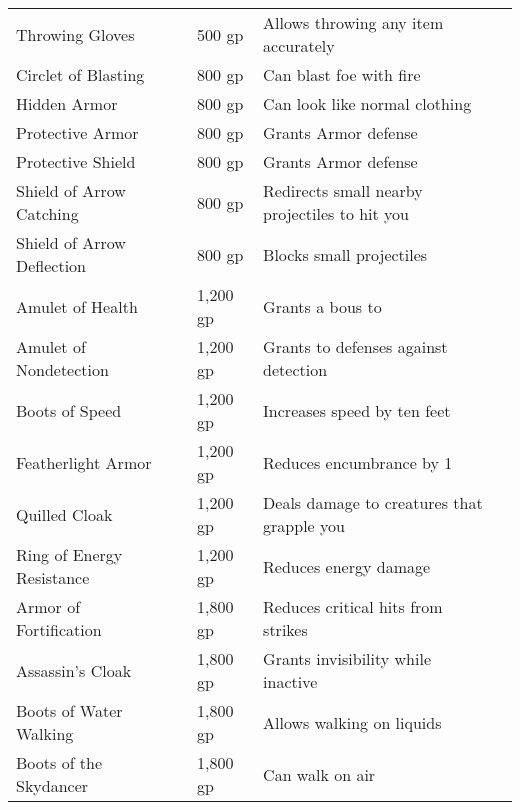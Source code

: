 \begin{longtabuwrapper}
\begin{longtabu}{l l l X l}
Throwing Gloves &  & 500 gp & Allows throwing any item accurately & \pageref{item:Throwing Gloves} \\
Circlet of Blasting &  & 800 gp & Can blast foe with fire & \pageref{item:Circlet of Blasting} \\
Hidden Armor &  & 800 gp & Can look like normal clothing & \pageref{item:Hidden Armor} \\
Protective Armor &  & 800 gp & Grants  Armor defense & \pageref{item:Protective Armor} \\
Protective Shield &  & 800 gp & Grants  Armor defense & \pageref{item:Protective Shield} \\
Shield of Arrow Catching &  & 800 gp & Redirects small nearby projectiles to hit you & \pageref{item:Shield of Arrow Catching} \\
Shield of Arrow Deflection &  & 800 gp & Blocks small projectiles & \pageref{item:Shield of Arrow Deflection} \\
Amulet of Health &  & 1,200 gp & Grants a  bous to  & \pageref{item:Amulet of Health} \\
Amulet of Nondetection &  & 1,200 gp & Grants  to defenses against detection & \pageref{item:Amulet of Nondetection} \\
Boots of Speed &  & 1,200 gp & Increases speed by ten feet & \pageref{item:Boots of Speed} \\
Featherlight Armor &  & 1,200 gp & Reduces encumbrance by 1 & \pageref{item:Featherlight Armor} \\
Quilled Cloak &  & 1,200 gp & Deals damage to creatures that grapple you & \pageref{item:Quilled Cloak} \\
Ring of Energy Resistance &  & 1,200 gp & Reduces energy damage & \pageref{item:Ring of Energy Resistance} \\
Armor of Fortification &  & 1,800 gp & Reduces critical hits from strikes & \pageref{item:Armor of Fortification} \\
Assassin's Cloak &  & 1,800 gp & Grants invisibility while inactive & \pageref{item:Assassin's Cloak} \\
Boots of Water Walking &  & 1,800 gp & Allows walking on liquids & \pageref{item:Boots of Water Walking} \\
Boots of the Skydancer &  & 1,800 gp & Can walk on air & \pageref{item:Boots of the Skydancer} \\

\end{longtabu}
\end{longtabuwrapper}
